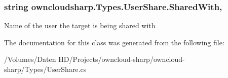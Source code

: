 \subsubsection[{Shared\+With}]{\setlength{\rightskip}{0pt plus 5cm}string owncloudsharp.\+Types.\+User\+Share.\+Shared\+With\hspace{0.3cm}{\ttfamily [get]}, {\ttfamily [set]}}\label{classowncloudsharp_1_1_types_1_1_user_share_a1d253a1b33f697479bf7a14f4b78bb4e}


Name of the user the target is being shared with 



The documentation for this class was generated from the following file\+:\begin{DoxyCompactItemize}
\item 
/\+Volumes/\+Daten H\+D/\+Projects/owncloud-\/sharp/owncloud-\/sharp/\+Types/User\+Share.\+cs\end{DoxyCompactItemize}
